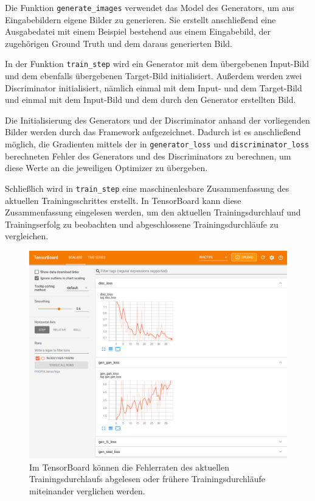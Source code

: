 Die Funktion \lstinline|generate_images| verwendet das Model des Generators, um aus Eingabebildern eigene Bilder zu generieren. Sie erstellt anschließend eine Ausgabedatei mit einem Beispiel bestehend aus einem Eingabebild, der zugehörigen Ground Truth und dem daraus generierten Bild.

In der Funktion \lstinline|train_step| wird ein Generator mit dem übergebenen Input-Bild und dem ebenfalls übergebenen Target-Bild initialisiert. Außerdem werden zwei Discriminator initialisiert, nämlich einmal mit dem Input- und dem Target-Bild und einmal mit dem Input-Bild und dem durch den Generator erstellten Bild.

Die Initialisierung des Generators und der Discriminator anhand der vorliegenden Bilder werden durch das Framework aufgezeichnet. Dadurch ist es anschließend möglich, die Gradienten mittels der in \lstinline|generator_loss| und \lstinline|discriminator_loss| berechneten Fehler des Generators und des Discriminators zu berechnen, um diese Werte an die jeweiligen Optimizer zu übergeben.

Schließlich wird in \lstinline|train_step| eine maschinenlesbare Zusammenfassung des aktuellen Trainingsschrittes erstellt. In TensorBoard kann diese Zusammenfassung eingelesen werden, um den aktuellen Trainingsdurchlauf und Trainingserfolg zu beobachten und abgeschlossene Trainingsdurchläufe zu vergleichen.

\begin{figure}[h]
	\centering
	\includegraphics[width=1.0\textwidth]{bilder/tensorboard.png}
	\caption[TensorBoard]{Im TensorBoard können die Fehlerraten des aktuellen Trainingsdurchlaufs abgelesen oder frühere Trainingsdurchläufe miteinander verglichen werden.}
	\label{fig:tensorboard}
\end{figure}

